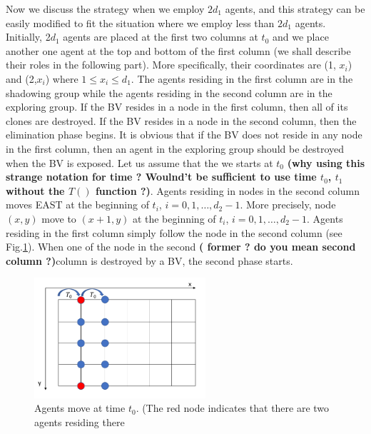 Now we discuss the strategy when we employ $2d_1$ agents, and this strategy can be easily modified to fit the situation where we employ less than $2d_1$ agents.\\
Initially, 2$d_1$ agents are placed at the first two columns at $t_0$ and we place another one agent at the top and bottom of the first column (we shall describe their roles in the following part). More specifically, their coordinates   are (1, $x_i$) and (2,$x_i$) where $1\leq x_i\leq d_1$. The agents residing in the first column are in the shadowing group while the agents residing in the second column are in the exploring group. If the BV resides in a node in the first column, then all of its clones are destroyed. If the BV resides in a node in the second column, then the elimination phase begins. It is obvious that if the BV does not reside in any node in the first column, then an agent in the exploring group should be destroyed when the BV is exposed.  Let us assume that the we starts at $t_0$ {\bf (why using this strange notation for time ? Woulnd't be sufficient to use time $t_0$, $t_1$ without the $T( )$ function ?)}. Agents residing in nodes in the second column moves EAST at the beginning of $t_i$, $i=0,1, \ldots ,d_2-1$. More precisely, node $(x, y)$ move to $(x+1, y)$ at the beginning of $t_i$, $i=0,1, \dots , d_2-1$. Agents residing in the first column simply follow the node in the second column (see  Fig.\ref{fig:moving}). When one of the node in the second {\bf ( former ? do you mean second column ?)}column is destroyed by a BV, the second phase starts.
\begin{figure}[H]
  \centering  
  \includegraphics[width=2.5in]{figures/moving.png}
  \caption{Agents move at time $t_0$. (The red node indicates that there are two agents residing there}\label{fig:moving}
\end{figure}
\\
